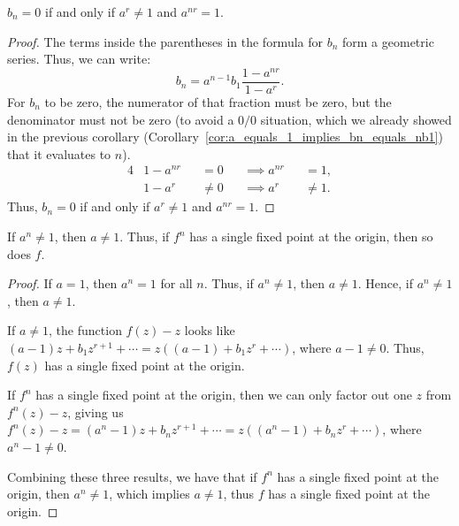 \begin{corollary}[$b_n = 0 \iff a^r \neq 1$ and $a^{nr} = 1$]
    $b_n = 0$ if and only if $a^r \neq 1$ and $a^{nr} = 1$.
\end{corollary}
\begin{proof}
    The terms inside the parentheses in the formula for $b_n$ form a geometric
    series. Thus, we can write:
    \[
        b_n = a^{n-1} b_1 \frac{1 - a^{nr}}{1 - a^r}.
    \]
    For $b_n$ to be zero, the numerator of that fraction must be zero, but the
    denominator must not be zero (to avoid a $0/0$ situation, which we already
    showed in the previous corollary
    (Corollary~\ref{cor:a_equals_1_implies_bn_equals_nb1}) that it evaluates to
    $n$).
    \begin{alignat*}{4}
        &1 - a^{nr} &&= 0    &&\implies a^{nr} &&= 1, \\
        &1 - a^r    &&\neq 0 &&\implies a^r    &&\neq 1.
    \end{alignat*}
    Thus, $b_n = 0$ if and only if $a^r \neq 1$ and $a^{nr} = 1$.
\end{proof}

\begin{remark}
    If $a^n \neq 1$, then $a \neq 1$. Thus, if $f^n$ has a single fixed point at
    the origin, then so does $f$.
\end{remark}
\begin{proof}
    If $a = 1$, then $a^n = 1$ for all $n$. Thus, if $a^n \neq 1$, then $a \neq
    1$. Hence, if $a^n \neq 1$, then $a \neq 1$.

    If $a \neq 1$, the function $f(z) - z$ looks like $(a-1)z + b_1 z^{r+1} +
    \cdots = z((a-1) + b_1 z^r + \cdots)$, where $a-1 \neq 0$. Thus, $f(z)$ has
    a single fixed point at the origin.

    If $f^n$ has a single fixed point at the origin, then we can only factor out
    one $z$ from $f^n(z) - z$, giving us $f^n(z) - z = (a^n - 1)z + b_n z^{r+1}
    + \cdots = z((a^n - 1) + b_n z^r + \cdots)$, where $a^n - 1 \neq 0$.

    Combining these three results, we have that if $f^n$ has a single fixed
    point at the origin, then $a^n \neq 1$, which implies $a \neq 1$, thus $f$
    has a single fixed point at the origin.
\end{proof}

